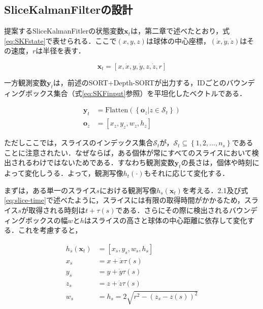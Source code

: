 \subsection{SliceKalmanFilterの設計}

提案するSliceKalmanFitlerの状態変数$\bm{x}_t$は，第二章で述べたとおり，式\ref{eq:SKFstate}で表せられる．ここで$(x,y,z)$は球体の中心座標，$(\dot{x}, \dot{y}, \dot{z})$はその速度，$r$は半径を表す．

\begin{equation}
    \label{eq:SKFstate}
    \bm{x}_t = \left[x, \dot{x}, y, \dot{y}, z, \dot{z}, r\right]
\end{equation}

一方観測変数$\bm{y}_t$は，前述のSORT+Depth-SORTが出力する，IDごとのバウンディングボックス集合（式\ref{eq:SKFinput}参照）を平坦化したベクトルである．

\begin{equation}
    \label{eq:SKFinput}
    \begin{aligned}
        \bm{y}_t &= \textrm{Flatten}(\left\{ \left. \bm{o}_z \right| z \in \mathcal{S}_t \right\})
        \\\bm{o}_z &= \left[x_z, y_z, w_z, h_z\right]
    \end{aligned}
\end{equation}

ただしここでは，スライスのインデックス集合$\mathcal{S}_t$が，$\mathcal{S}_t \subseteq  \left\{1,2,...,n_s\right\}$であることに注意されたい．なぜならば，ある個体が常にすべてのスライスにおいて検出されるわけではないためである．すなわち観測変数$\bm{y}_t$の長さは，個体や時刻によって変化しうる．よって，観測写像$h_t(\cdot)$もそれに応じて変化する．
\par
まずは，ある単一のスライス$s$における観測写像$h_s(\bm{x}_t)$を考える．2.1及び式\ref{eq:slice-time}で述べたように，スライスには有限の取得時間がかかるため，スライス$s$が取得される時刻は$t+\tau(s)$である．さらにその際に検出されるバウンディングボックスの幅$w$と$h$はスライスの高さと球体の中心距離に依存して変化する．これを考慮すると，

\begin{equation}
    \label{eq:slice_observation_map}
    \begin{aligned}
        h_s(\bm{x}_t) &= \left[x_s, y_s, w_s, h_s\right]
        \\ x_s &= x + \dot{x} \tau(s)
        \\ y_s &= y + \dot{y} \tau(s)
        \\ z_s &= z + \dot{z} \tau(s)
        \\ w_s &= h_s = 2 \sqrt{r^2 - (z_s - z(s))^2}
    \end{aligned}
\end{equation}

